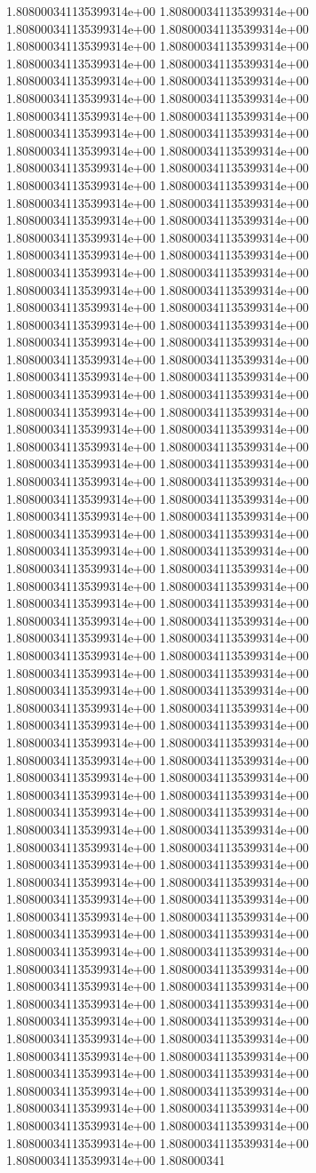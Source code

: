 1.808000341135399314e+00	1.808000341135399314e+00	1.808000341135399314e+00	1.808000341135399314e+00	1.808000341135399314e+00	1.808000341135399314e+00	1.808000341135399314e+00	1.808000341135399314e+00	1.808000341135399314e+00	1.808000341135399314e+00	1.808000341135399314e+00	1.808000341135399314e+00	1.808000341135399314e+00	1.808000341135399314e+00	1.808000341135399314e+00	1.808000341135399314e+00	1.808000341135399314e+00	1.808000341135399314e+00	1.808000341135399314e+00	1.808000341135399314e+00	1.808000341135399314e+00	1.808000341135399314e+00	1.808000341135399314e+00	1.808000341135399314e+00	1.808000341135399314e+00	1.808000341135399314e+00	1.808000341135399314e+00	1.808000341135399314e+00	1.808000341135399314e+00	1.808000341135399314e+00	1.808000341135399314e+00	1.808000341135399314e+00	1.808000341135399314e+00	1.808000341135399314e+00	1.808000341135399314e+00	1.808000341135399314e+00	1.808000341135399314e+00	1.808000341135399314e+00	1.808000341135399314e+00	1.808000341135399314e+00	1.808000341135399314e+00	1.808000341135399314e+00	1.808000341135399314e+00	1.808000341135399314e+00	1.808000341135399314e+00	1.808000341135399314e+00	1.808000341135399314e+00	1.808000341135399314e+00	1.808000341135399314e+00	1.808000341135399314e+00	1.808000341135399314e+00	1.808000341135399314e+00	1.808000341135399314e+00	1.808000341135399314e+00	1.808000341135399314e+00	1.808000341135399314e+00	1.808000341135399314e+00	1.808000341135399314e+00	1.808000341135399314e+00	1.808000341135399314e+00	1.808000341135399314e+00	1.808000341135399314e+00	1.808000341135399314e+00	1.808000341135399314e+00	1.808000341135399314e+00	1.808000341135399314e+00	1.808000341135399314e+00	1.808000341135399314e+00	1.808000341135399314e+00	1.808000341135399314e+00	1.808000341135399314e+00	1.808000341135399314e+00	1.808000341135399314e+00	1.808000341135399314e+00	1.808000341135399314e+00	1.808000341135399314e+00	1.808000341135399314e+00	1.808000341135399314e+00	1.808000341135399314e+00	1.808000341135399314e+00	1.808000341135399314e+00	1.808000341135399314e+00	1.808000341135399314e+00	1.808000341135399314e+00	1.808000341135399314e+00	1.808000341135399314e+00	1.808000341135399314e+00	1.808000341135399314e+00	1.808000341135399314e+00	1.808000341135399314e+00	1.808000341135399314e+00	1.808000341135399314e+00	1.808000341135399314e+00	1.808000341135399314e+00	1.808000341135399314e+00	1.808000341135399314e+00	1.808000341135399314e+00	1.808000341135399314e+00	1.808000341135399314e+00	1.808000341135399314e+00	1.808000341135399314e+00	1.808000341135399314e+00	1.808000341135399314e+00	1.808000341135399314e+00	1.808000341135399314e+00	1.808000341135399314e+00	1.808000341135399314e+00	1.808000341135399314e+00	1.808000341135399314e+00	1.808000341135399314e+00	1.808000341135399314e+00	1.808000341135399314e+00	1.808000341135399314e+00	1.808000341135399314e+00	1.808000341135399314e+00	1.808000341135399314e+00	1.808000341135399314e+00	1.808000341135399314e+00	1.808000341135399314e+00	1.808000341135399314e+00	1.808000341135399314e+00	1.808000341135399314e+00	1.808000341135399314e+00	1.808000341135399314e+00	1.808000341135399314e+00	1.808000341135399314e+00	1.808000341135399314e+00	1.808000341135399314e+00	1.808000341135399314e+00	1.808000341135399314e+00	1.808000341135399314e+00	1.808000341135399314e+00	1.808000341135399314e+00	1.808000341